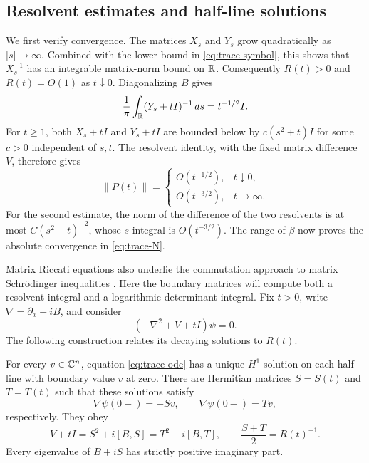 \subsection{Resolvent estimates and half-line solutions}

We first verify convergence.  The matrices $X_s$ and $Y_s$ grow
quadratically as $|s|\to\infty$.  Combined with the lower bound in
\eqref{eq:trace-symbol}, this shows that $X_s^{-1}$ has an integrable
matrix-norm bound on $\mathbb R$.  Consequently $R(t)>0$ and $R(t)=O(1)$ as
$t\downarrow0$.  Diagonalizing $B$ gives
\[
 \frac1\pi\int_\mathbb R(Y_s+tI)^{-1}\,ds=t^{-1/2}I.
\]
For $t\geq1$, both $X_s+tI$ and $Y_s+tI$ are bounded below by
$c(s^2+t)I$ for some $c>0$ independent of $s,t$.  The resolvent
identity, with the fixed matrix difference $V$, therefore gives
\begin{equation}\label{eq:trace-P-bounds}
 \|P(t)\|=
 \begin{cases}
  O(t^{-1/2}),&t\downarrow0,\\
  O(t^{-3/2}),&t\to\infty.
 \end{cases}
\end{equation}
For the second estimate, the norm of the difference of the two
resolvents is at most $C(s^2+t)^{-2}$, whose $s$-integral is
$O(t^{-3/2})$.  The range of $\beta$ now proves the absolute
convergence in \eqref{eq:trace-N}.

Matrix Riccati equations also underlie the commutation approach to
matrix Schr\"odinger inequalities \cite{BenguriaLoss2000}.  Here the
boundary matrices will compute both a resolvent integral and a
logarithmic determinant integral.  Fix $t>0$, write
$\nabla=\partial_x-iB$, and consider
\begin{equation}\label{eq:trace-ode}
                    (-\nabla^2+V+tI)\psi=0.
\end{equation}
The following construction relates its decaying solutions to $R(t)$.

\begin{lemma}\label{lem:trace-half-lines}
For every $v\in\mathbb C^n$, equation \eqref{eq:trace-ode} has a unique
$H^1$ solution on each half-line with boundary value $v$ at zero.
There are Hermitian matrices $S=S(t)$ and $T=T(t)$ such that these
solutions satisfy
\begin{equation}\label{eq:trace-boundary-maps}
 \nabla\psi(0+)=-Sv,\qquad \nabla\psi(0-)=Tv,
\end{equation}
respectively.  They obey
\begin{equation}\label{eq:trace-riccati}
 V+tI=S^2+i[B,S]=T^2-i[B,T],
 \qquad \frac{S+T}{2}=R(t)^{-1}.
\end{equation}
Every eigenvalue of $B+iS$ has strictly positive imaginary part.
\end{lemma}

